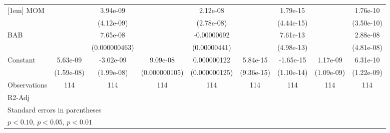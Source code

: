 \begin{table}[htbp]
\begin{tabular}{l*{8}{c}}
[1em]
MOM                 &                     &    3.94e-09         &                     &    2.12e-08         &                     &    1.79e-15         &                     &    1.76e-10         \\
                    &                     &  (4.12e-09)         &                     &  (2.78e-08)         &                     &  (4.44e-15)         &                     &  (3.50e-10)         \\
[1em]
BAB                 &                     &    7.65e-08         &                     & -0.00000692         &                     &    7.61e-13         &                     &    2.88e-08         \\
                    &                     &(0.000000463)         &                     &(0.00000441)         &                     &  (4.98e-13)         &                     &  (4.81e-08)         \\
[1em]
Constant            &    5.63e-09         &   -3.02e-09         &    9.09e-08         & 0.000000122         &    5.84e-15         &   -1.65e-15         &    1.17e-09         &    6.31e-10         \\
                    &  (1.59e-08)         &  (1.99e-08)         &(0.000000105)         &(0.000000125)         &  (9.36e-15)         &  (1.10e-14)         &  (1.09e-09)         &  (1.22e-09)         \\
\hline
Observations        &         114         &         114         &         114         &         114         &         114         &         114         &         114         &         114         \\
R2-Adj              &                     &                     &                     &                     &                     &                     &                     &                     \\
\hline\hline
\multicolumn{9}{l}{\footnotesize Standard errors in parentheses}\\
\multicolumn{9}{l}{\footnotesize \sym{*} \(p<0.10\), \sym{**} \(p<0.05\), \sym{***} \(p<0.01\)}\\
\end{tabular}
\end{table}
